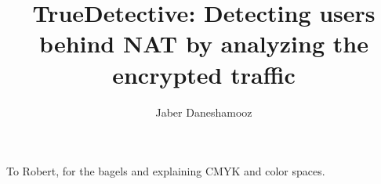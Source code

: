 \documentclass[sigconf]{acmart}
\begin{document}
\title{TrueDetective: Detecting users behind NAT by analyzing the encrypted traffic}


\author{Jaber Daneshamooz}







\renewcommand{\shortauthors}{Jaber et al.}






\maketitle







\begin{acks}
To Robert, for the bagels and explaining CMYK and color spaces.
\end{acks}



\end{document}
